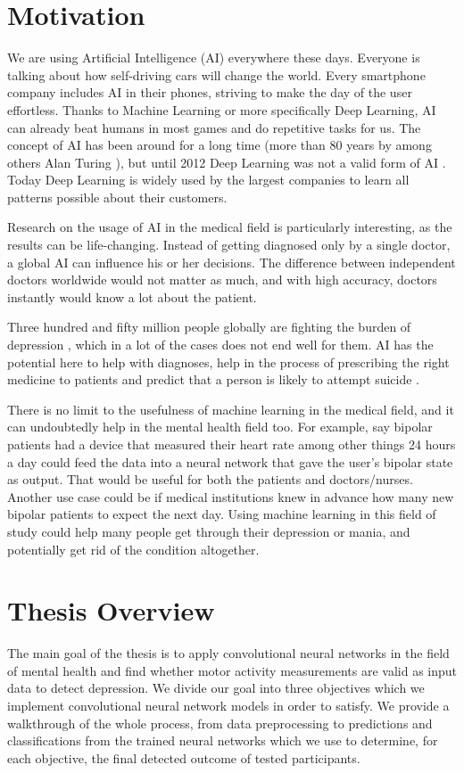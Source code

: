 \section{Motivation}

We are using Artificial Intelligence (AI) everywhere these days. Everyone is talking about how self-driving cars will change the world. Every smartphone company includes AI in their phones, striving to make the day of the user effortless. Thanks to Machine Learning or more specifically Deep Learning, AI can already beat humans in most games and do repetitive tasks for us. The concept of AI has been around for a long time (more than 80 years by among others Alan Turing \cite{turing1938}), but until 2012 Deep Learning was not a valid form of AI \cite{topol2019}. Today Deep Learning is widely used by the largest companies to learn all patterns possible about their customers. 

Research on the usage of AI in the medical field is particularly interesting, as the results can be life-changing. Instead of getting diagnosed only by a single doctor, a global AI can influence his or her decisions. The difference between independent doctors worldwide would not matter as much, and with high accuracy, doctors instantly would know a lot about the patient. 

Three hundred and fifty million people globally are fighting the burden of depression \cite{burden_of_depression}, which in a lot of the cases does not end well for them. AI has the potential here to help with diagnoses, help in the process of prescribing the right medicine to patients and predict that a person is likely to attempt suicide \cite{topol2019}. 

There is no limit to the usefulness of machine learning in the medical field, and it can undoubtedly help in the mental health field too. For example, say bipolar patients had a device that measured their heart rate among other things 24 hours a day could feed the data into a neural network that gave the user's bipolar state as output. That would be useful for both the patients and doctors/nurses. Another use case could be if medical institutions knew in advance how many new bipolar patients to expect the next day. Using machine learning in this field of study could help many people get through their depression or mania, and potentially get rid of the condition altogether.

\section{Thesis Overview}
The main goal of the thesis is to apply convolutional neural networks in the field of mental health and find whether motor activity measurements are valid as input data to detect depression. We divide our goal into three objectives which we implement convolutional neural network models in order to satisfy. We provide a walkthrough of the whole process, from data preprocessing to predictions and classifications from the trained neural networks which we use to determine, for each objective, the final detected outcome of tested participants.

